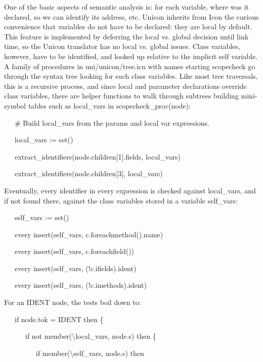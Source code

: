 One of the basic aspects of semantic analysis is: for each variable,
where was it declared, so we can identify its address, etc. Unicon
inherits from Icon the curious convenience that variables do not have
to be declared: they are local by default. This feature is implemented
by deferring the local vs. global decision until link time, so the
Unicon translator has no local vs. global issues. Class variables,
however, have to be identified, and looked up relative to the implicit
{\textquotedbl}self{\textquotedbl} variable. A family of procedures in
uni/unicon/tree.icn with names starting
{\textquotedbl}scopecheck{\textquotedbl} go through the syntax tree
looking for such class variables. Like most tree traversals, this is a
recursive process, and since local and parameter declarations override
class variables, there are helper functions to walk through subtrees
building mini-symbol tables such as local\_vars in
scopecheck\_proc(node):

{\ttfamily\mdseries
\ \ \ \# Build local\_vars from the params and local var expressions.}

{\ttfamily\mdseries
\ \ \ local\_vars := set()}

{\ttfamily\mdseries
\ \ \ extract\_identifiers(node.children[1].fields, local\_vars)}

{\ttfamily\mdseries
\ \ \ extract\_identifiers(node.children[3], local\_vars)}

Eventually, every identifier in every expression is checked against
local\_vars, and if not found there, against the class variables
stored in a variable self\_vars:

{\ttfamily\mdseries
\ \ \ self\_vars := set()}

{\ttfamily\mdseries
\ \ \ every insert(self\_vars, c.foreachmethod().name)}

{\ttfamily\mdseries
\ \ \ every insert(self\_vars, c.foreachfield())}

{\ttfamily\mdseries
\ \ \ every insert(self\_vars, (!c.ifields).ident)}

{\ttfamily\mdseries
\ \ \ every insert(self\_vars, (!c.imethods).ident)}

For an IDENT node, the tests boil down to: 

{\ttfamily\mdseries
\ \ \ if node.tok = IDENT then \{}

{\ttfamily\mdseries
\ \ \ \ \ \ if not member({\textbackslash}local\_vars, node.s) then \{}

{\ttfamily\mdseries
\ \ \ \ \ \ \ \ \ if member({\textbackslash}self\_vars, node.s) then}

